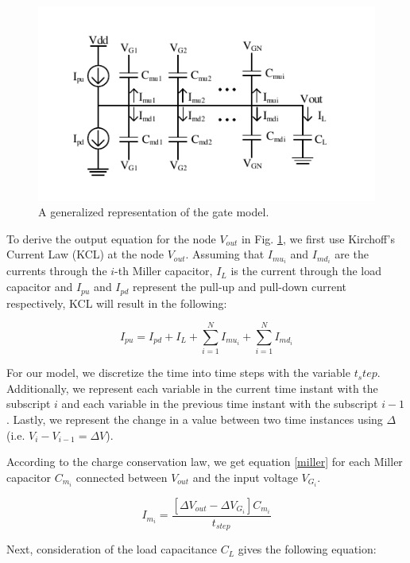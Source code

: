 \begin{figure}[!htbp]
	\centering
	\includegraphics[width=0.75\linewidth]{Figures/GenModel}
	\caption{A generalized representation of the gate model.}
	\label{Gmod}
\end{figure}

To derive the output equation for the node $V_{out}$ in Fig. \ref{Gmod}, we first use Kirchoff’s Current Law (KCL) at the node $V_{out}$. Assuming that $I_{mu_i}$ and $I_{md_i}$ are the currents through the $i$-th Miller capacitor, $I_L$ is the current through the load capacitor and $I_{pu}$ and $I_{pd}$ represent the pull-up and pull-down current respectively, KCL will result in the following:

\begin{equation}\label{KCL}
I_{pu} = I_{pd} + I_L + \sum_{i=1}^{N}I_{mu_i} + \sum_{i=1}^{N}I_{md_i}
\end{equation}

For our model, we discretize the time into time steps with the variable $t_step$. Additionally, we represent each variable in the current time instant with the subscript $i$ and each variable in the previous time instant with the subscript $i-1$. Lastly, we represent the change in a value between two time instances using $\Delta$ (i.e. $V_i-V_{i-1}=\Delta V$). 

According to the charge conservation law, we get equation \ref{miller} for each Miller capacitor $C_{m_i}$ connected between $V_{out}$ and the input voltage $V_{G_i}$.

\begin{equation}\label{miller}
I_{m_i} = \frac{[\Delta V_{out} - \Delta V_{G_i}]C_{m_i}}{t_{step}}
\end{equation}

Next, consideration of the load capacitance $C_L$ gives the following equation:

